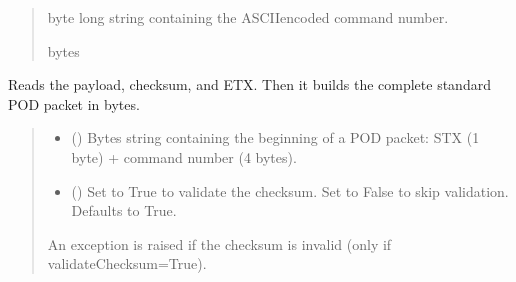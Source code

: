 \documentclass[letterpaper,10pt,english]{sphinxmanual}
\begin{document}
\begin{fulllineitems}
\begin{fulllineitems}
\begin{quote}
\begin{description}
 byte long string containing the ASCII\sphinxhyphen{}encoded command number.

\sphinxAtStartPar
bytes

\end{description}\end{quote}

\end{fulllineitems}


\begin{fulllineitems}
\label{\detokenize{Morelia.Devices:Morelia.Devices.BasicPodProtocol.Pod._Read_Standard}}
\pysigstartsignatures
{}
\pysigstopsignatures
\sphinxAtStartPar
Reads the payload, checksum, and ETX. Then it builds the complete standard POD packet in bytes.
\begin{quote}\begin{description}
\begin{itemize}
\item {} 
\sphinxAtStartPar
{} () \textendash{} Bytes string containing the beginning of a POD packet: STX (1 byte)                 + command number (4 bytes).

\item {} 
\sphinxAtStartPar
{} (\sphinxstyleliteralemphasis{\sphinxupquote{, }}) \textendash{} Set to True to validate the checksum. Set to False to                 skip validation. Defaults to True.

\end{itemize}

\sphinxAtStartPar
{} \textendash{} An exception is raised if the checksum is invalid (only if validateChecksum=True).


\end{description}
\end{quote}
\end{fulllineitems}
\end{fulllineitems}
\end{document}
